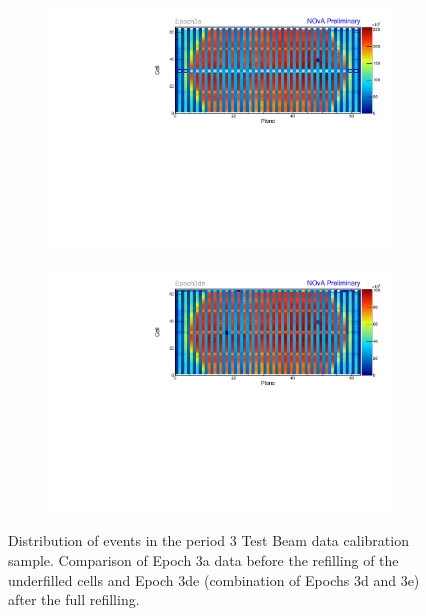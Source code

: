 \begin{figure}[!hbtp]
\centering
\begin{subfigure}[b]{\textwidth}
\centering
\includegraphics[width=\textwidth]{Plots/TBCalibration/Attenprofs_P3Data_CellPlane_Epoch3a.pdf}
\end{subfigure}
\begin{subfigure}[b]{\textwidth}
\centering
\includegraphics[width=\textwidth]{Plots/TBCalibration/Attenprofs_P3Data_CellPlane_Epoch3de.pdf}
\end{subfigure}
\caption[Plane-Cell distribution of hits for the period 3 data sample]{Distribution of events in the period 3 Test Beam data calibration sample. Comparison of Epoch 3a data before the refilling of the underfilled cells and Epoch 3de (combination of Epochs 3d and 3e) after the full refilling.}
\label{fig:Calibhist_period3}
\end{figure}

